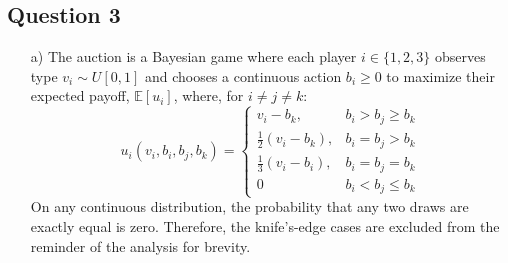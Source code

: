 \documentclass{article}
\newcommand{\E}[1]{\mathbb{E}\left[#1\right]} %
\begin{document}

\subsection*{Question 3}

\begin{itemize}
	\item[a)] The auction is a Bayesian game where each player ${i\in\{1,2,3\}}$ observes type ${v_i\sim U[0,1]}$ and chooses a continuous action ${b_i\geq 0}$ to maximize their expected payoff, $\E{u_i}$, where, for ${i\neq j \neq k}$:
		\[
			u_i(v_i,b_i,b_j,b_k) =	\begin{cases}
										v_i - b_k, 				&b_i>b_j\geq b_k 					\\
										\frac{1}{2}(v_i-b_k), 	&b_i=b_j>b_k						\\
										\frac{1}{3}(v_i-b_i),	&b_i=b_j=b_k						\\
										0						&b_i < b_j\leq b_k
									\end{cases}
		\]
		On any continuous distribution, the probability that any two draws are exactly equal is zero. Therefore, the knife's-edge cases are excluded from the reminder of the analysis for brevity.


\end{itemize}
\end{document}
